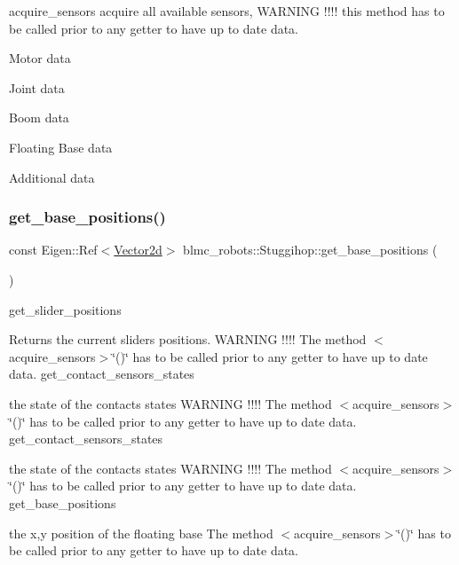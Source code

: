 acquire\+\_\+sensors acquire all available sensors, W\+A\+R\+N\+I\+NG !!!! this method has to be called prior to any getter to have up to date data. 

Motor data

Joint data

Boom data

Floating Base data

Additional data\mbox{\label{classblmc__robots_1_1Stuggihop_a6da73065d935420daf4959b8f912128c}} 
\subsubsection{\texorpdfstring{get\+\_\+base\+\_\+positions()}{get\_base\_positions()}}
{\footnotesize\ttfamily const Eigen\+::\+Ref$<$\hyperlink{common__header_8hpp_acb6916bc8c9fe9d98c484fd4cc201447}{Vector2d}$>$ blmc\+\_\+robots\+::\+Stuggihop\+::get\+\_\+base\+\_\+positions (\begin{DoxyParamCaption}{ }\end{DoxyParamCaption})\hspace{0.3cm}{\ttfamily [inline]}}



get\+\_\+slider\+\_\+positions 

\begin{DoxyReturn}{Returns}
the current sliders positions. W\+A\+R\+N\+I\+NG !!!! The method $<$acquire\+\_\+sensors$>$\char`\"{}()\char`\"{} has to be called prior to any getter to have up to date data. get\+\_\+contact\+\_\+sensors\+\_\+states 

the state of the contacts states W\+A\+R\+N\+I\+NG !!!! The method $<$acquire\+\_\+sensors$>$\char`\"{}()\char`\"{} has to be called prior to any getter to have up to date data. get\+\_\+contact\+\_\+sensors\+\_\+states 

the state of the contacts states W\+A\+R\+N\+I\+NG !!!! The method $<$acquire\+\_\+sensors$>$\char`\"{}()\char`\"{} has to be called prior to any getter to have up to date data. get\+\_\+base\+\_\+positions 

the x,y position of the floating base The method $<$acquire\+\_\+sensors$>$\char`\"{}()\char`\"{} has to be called prior to any getter to have up to date data. 
\end{DoxyReturn}
\mbox{\label{classblmc__robots_1_1Stuggihop_a7f869117918d0d5d5813d29222430d88}} 
